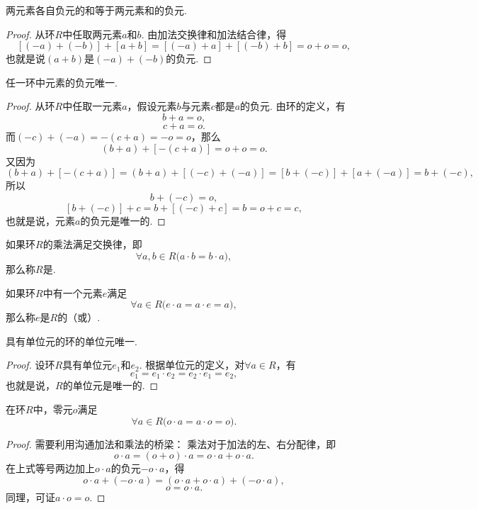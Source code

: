 \begin{property}
两元素各自负元的和等于两元素和的负元.
\begin{proof}
从环\(R\)中任取两元素\(a\)和\(b\).
由加法交换律和加法结合律，得\[
[(-a) + (-b)] + [a + b]
= [(-a) + a] + [(-b) + b]
= o + o = o,
\]也就是说\((a+b)\)是\((-a) + (-b)\)的负元.
\end{proof}
\end{property}

\begin{property}
任一环中元素的负元唯一.
\begin{proof}
从环\(R\)中任取一元素\(a\)，假设元素\(b\)与元素\(c\)都是\(a\)的负元.
由环的定义，有\[
b + a = o,
\]\[
c + a = o.
\]而\((-c) + (-a) = -(c + a) = -o = o\)，那么\[
(b + a) + [-(c + a)]
= o + o = o.
\]又因为\[
(b + a) + [-(c + a)]
= (b + a) + [(-c) + (-a)]
= [b + (-c)] + [a + (-a)]
= b + (-c),
\]所以\[
b + (-c) = o,
\]\[
[b + (-c)] + c = b + [(-c) + c] = b = o + c = c,
\]也就是说，元素\(a\)的负元是唯一的.
\end{proof}
\end{property}

\begin{definition}
如果环\(R\)的乘法满足交换律，即\[
\forall a,b \in R \bigl( a \cdot b = b \cdot a \bigr),
\]那么称\(R\)是.
\end{definition}

\begin{definition}
如果环\(R\)中有一个元素\(e\)满足\[
\forall a \in R \bigl( e \cdot a = a \cdot e = a \bigr),
\]那么称\(e\)是\(R\)的（或）.
\end{definition}

\begin{property}
具有单位元的环的单位元唯一.
\begin{proof}
设环\(R\)具有单位元\(e_1\)和\(e_2\).
根据单位元的定义，对\(\forall a \in R\)，有\[
e_1 = e_1 \cdot e_2 = e_2 \cdot e_1 = e_2,
\]也就是说，\(R\)的单位元是唯一的.
\end{proof}
\end{property}

\begin{theorem}[乘零定理]
在环\(R\)中，零元\(o\)满足\[
\forall a \in R \bigl( o \cdot a = a \cdot o = o \bigr).
\]
\begin{proof}
需要利用沟通加法和乘法的桥梁：
乘法对于加法的左、右分配律，即\[
o \cdot a = (o + o) \cdot a = o \cdot a + o \cdot a.
\]在上式等号两边加上\(o \cdot a\)的负元\(-o \cdot a\)，得\[
o \cdot a + (- o \cdot a) = (o \cdot a + o \cdot a) + (- o \cdot a),
\]\[
o = o \cdot a.
\]同理，可证\(a \cdot o = o\).
\end{proof}
\end{theorem}

